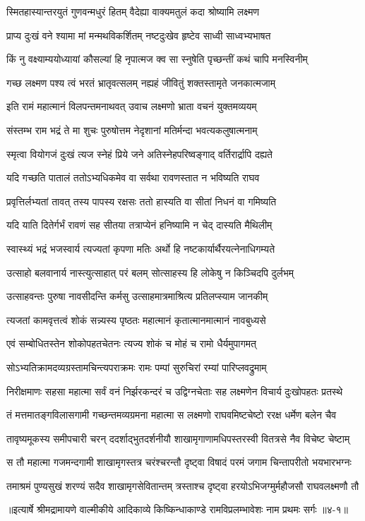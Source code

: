 \twolineshloka
{स्मितहास्यान्तरयुतं गुणवन्मधुरं हितम्}
{वैदेह्या वाक्यमतुलं कदा श्रोष्यामि लक्ष्मण} %

\twolineshloka
{प्राप्य दुःखं वने श्यामा मां मन्मथविकर्शितम्}
{नष्टदुःखेव हृष्टेव साध्वी साध्वभ्यभाषत} %

\twolineshloka
{किं नु वक्ष्याम्ययोध्यायां कौसल्यां हि नृपात्मज}
{क्व सा स्नुषेति पृच्छन्तीं कथं चापि मनस्विनीम्} %

\twolineshloka
{गच्छ लक्ष्मण पश्य त्वं भरतं भ्रातृवत्सलम्}
{नह्यहं जीवितुं शक्तस्तामृते जनकात्मजाम्} %

\twolineshloka
{इति रामं महात्मानं विलपन्तमनाथवत्}
{उवाच लक्ष्मणो भ्राता वचनं युक्तमव्ययम्} %

\twolineshloka
{संस्तम्भ राम भद्रं ते मा शुचः पुरुषोत्तम}
{नेदृशानां मतिर्मन्दा भवत्यकलुषात्मनाम्} %

\twolineshloka
{स्मृत्वा वियोगजं दुःखं त्यज स्नेहं प्रिये जने}
{अतिस्नेहपरिष्वङ्गाद् वर्तिरार्द्रापि दह्यते} %

\twolineshloka
{यदि गच्छति पातालं ततोऽभ्यधिकमेव वा}
{सर्वथा रावणस्तात न भविष्यति राघव} %

\twolineshloka
{प्रवृत्तिर्लभ्यतां तावत् तस्य पापस्य रक्षसः}
{ततो हास्यति वा सीतां निधनं वा गमिष्यति} %

\twolineshloka
{यदि याति दितेर्गर्भं रावणं सह सीतया}
{तत्राप्येनं हनिष्यामि न चेद् दास्यति मैथिलीम्} %

\twolineshloka
{स्वास्थ्यं भद्रं भजस्वार्य त्यज्यतां कृपणा मतिः}
{अर्थो हि नष्टकार्यार्थैरयत्नेनाधिगम्यते} %

\twolineshloka
{उत्साहो बलवानार्य नास्त्युत्साहात् परं बलम्}
{सोत्साहस्य हि लोकेषु न किञ्चिदपि दुर्लभम्} %

\twolineshloka
{उत्साहवन्तः पुरुषा नावसीदन्ति कर्मसु}
{उत्साहमात्रमाश्रित्य प्रतिलप्स्याम जानकीम्} %

\twolineshloka
{त्यजतां कामवृत्तत्वं शोकं सन्न्यस्य पृष्ठतः}
{महात्मानं कृतात्मानमात्मानं नावबुध्यसे} %

\twolineshloka
{एवं सम्बोधितस्तेन शोकोपहतचेतनः}
{त्यज्य शोकं च मोहं च रामो धैर्यमुपागमत्} %

\twolineshloka
{सोऽभ्यतिक्रामदव्यग्रस्तामचिन्त्यपराक्रमः}
{रामः पम्पां सुरुचिरां रम्यां पारिप्लवद्रुमाम्} %

\twolineshloka
{निरीक्षमाणः सहसा महात्मा सर्वं वनं निर्झरकन्दरं च}
{उद्विग्नचेताः सह लक्ष्मणेन विचार्य दुःखोपहतः प्रतस्थे} %

\twolineshloka
{तं मत्तमातङ्गविलासगामी गच्छन्तमव्यग्रमना महात्मा}
{स लक्ष्मणो राघवमिष्टचेष्टो ररक्ष धर्मेण बलेन चैव} %

\twolineshloka
{तावृष्यमूकस्य समीपचारी चरन् ददर्शाद्भुतदर्शनीयौ}
{शाखामृगाणामधिपस्तरस्वी वितत्रसे नैव विचेष्ट चेष्टाम्} %

\twolineshloka
{स तौ महात्मा गजमन्दगामी शाखामृगस्तत्र चरंश्चरन्तौ}
{दृष्ट्वा विषादं परमं जगाम चिन्तापरीतो भयभारभग्नः} %

\twolineshloka
{तमाश्रमं पुण्यसुखं शरण्यं सदैव शाखामृगसेवितान्तम्}
{त्रस्ताश्च दृष्ट्वा हरयोऽभिजग्मुर्महौजसौ राघवलक्ष्मणौ तौ} %


॥इत्यार्षे श्रीमद्रामायणे वाल्मीकीये आदिकाव्ये किष्किन्धाकाण्डे रामविप्रलम्भावेशः नाम प्रथमः सर्गः ॥४-१॥
